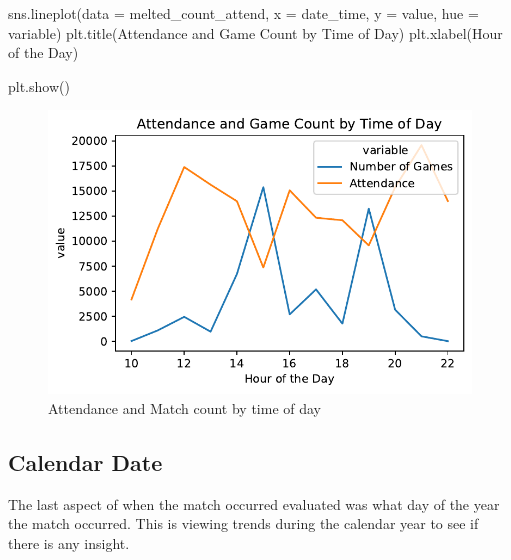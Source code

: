 \documentclass[
  letterpaper,
  DIV=11,
  numbers=noendperiod]{scrartcl}
\newenvironment{Shaded}{\begin{snugshade}}{\end{snugshade}}
\newcommand{\NormalTok}[1]{\textcolor[rgb]{0.00,0.23,0.31}{#1}}
\newcommand{\OperatorTok}[1]{\textcolor[rgb]{0.37,0.37,0.37}{#1}}
\newcommand{\StringTok}[1]{\textcolor[rgb]{0.13,0.47,0.30}{#1}}
\begin{document}
\begin{Shaded}
\begin{Highlighting}[]
\NormalTok{sns.lineplot(data }\OperatorTok{=}\NormalTok{ melted\_count\_attend, x }\OperatorTok{=} \StringTok{\textquotesingle{}date\_time\textquotesingle{}}\NormalTok{, y }\OperatorTok{=} \StringTok{\textquotesingle{}value\textquotesingle{}}\NormalTok{, hue }\OperatorTok{=} \StringTok{\textquotesingle{}variable\textquotesingle{}}\NormalTok{)}
\NormalTok{plt.title(}\StringTok{\textquotesingle{}Attendance and Game Count by Time of Day\textquotesingle{}}\NormalTok{)}
\NormalTok{plt.xlabel(}\StringTok{\textquotesingle{}Hour of the Day\textquotesingle{}}\NormalTok{)}

\NormalTok{plt.show()}
\end{Highlighting}
\end{Shaded}

\begin{figure}[H]

{\centering \includegraphics{Blog_post_files/figure-pdf/fig-attendance_time-output-1.pdf}

}

\caption{\label{fig-attendance_time}Attendance and Match count by time
of day}

\end{figure}

\hypertarget{calendar-date}{%
\subsection{Calendar Date}\label{calendar-date}}

The last aspect of when the match occurred evaluated was what day of the
year the match occurred. This is viewing trends during the calendar year
to see if there is any insight.
\end{document}
